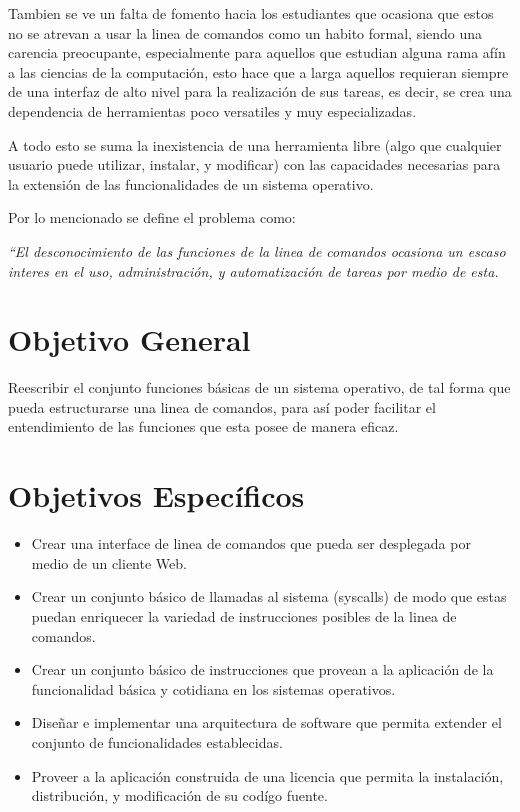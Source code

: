 \documentclass[letterpaper,11pt]{article}
\begin{document}
Tambien se ve un falta de fomento hacia los estudiantes que ocasiona que estos
no se atrevan a usar la linea de comandos como un habito formal, siendo una
carencia preocupante, especialmente para aquellos que estudian alguna rama
afín a las ciencias de la computación, esto hace que a larga aquellos
requieran siempre de una interfaz de alto nivel para la realización de sus
tareas, es decir, se crea una dependencia de herramientas poco versatiles y
muy especializadas.

A todo esto se suma la inexistencia de una herramienta libre (algo que
cualquier usuario puede utilizar, instalar, y modificar) con las capacidades
necesarias para la extensión de las funcionalidades de un sistema operativo.

Por lo mencionado se define el problema como:

\emph{“El desconocimiento de las funciones de la linea de comandos ocasiona un
escaso interes en el uso, administración, y automatización de tareas por medio
de esta.}

\section{Objetivo General}
Reescribir el conjunto funciones básicas de un sistema operativo, de tal forma
que pueda estructurarse una linea de comandos, para así poder facilitar el
entendimiento de las funciones que esta posee de manera eficaz.

\section{Objetivos Específicos}
\begin{itemize}
\item Crear una interface de linea de comandos que pueda ser desplegada por
medio de un cliente Web.
\item Crear un conjunto básico de llamadas al sistema (syscalls) de modo que
estas puedan enriquecer la variedad de instrucciones posibles de la linea de
comandos.
\item Crear un conjunto básico de instrucciones que provean a la aplicación de
la funcionalidad básica y cotidiana en los sistemas operativos.
\item Diseñar e implementar una arquitectura de software que permita extender
el conjunto de funcionalidades establecidas.
\item Proveer a la aplicación construida de una licencia que permita la
instalación, distribución, y modificación de su codígo fuente.
\end{itemize}
\end{document}
